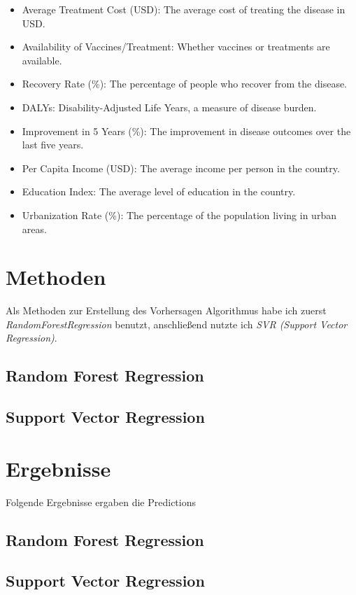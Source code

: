 \documentclass[a4paper,12pt]{article}
\begin{document}
\begin{itemize}
\item Average Treatment Cost (USD): The average cost of treating the disease in USD.

\item Availability of Vaccines/Treatment: Whether vaccines or treatments are available.

\item Recovery Rate (\%): The percentage of people who recover from the disease.

\item DALYs: Disability-Adjusted Life Years, a measure of disease burden.

\item Improvement in 5 Years (\%): The improvement in disease outcomes over the last five years.

\item Per Capita Income (USD): The average income per person in the country.

\item Education Index: The average level of education in the country.

\item Urbanization Rate (\%): The percentage of the population living in urban areas.

\end{itemize}


\section{Methoden}
Als Methoden zur Erstellung des Vorhersagen Algorithmus habe ich zuerst \textit{ RandomForestRegression} benutzt, anschließend nutzte ich
\textit{SVR (Support Vector Regression)}.
\subsection{Random Forest Regression}
\subsection{Support Vector Regression}
\section{Ergebnisse}
Folgende Ergebnisse ergaben die Predictions
\subsection{Random Forest Regression}
\subsection{Support Vector Regression}
\end{document}
